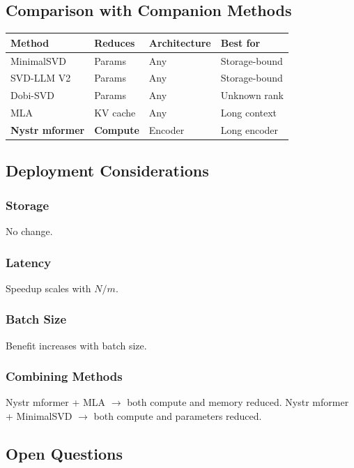\subsection{Comparison with Companion Methods}

\begin{table}[H]
\centering
\small
\begin{tabular}{llll}
\toprule
\textbf{Method} & \textbf{Reduces} & \textbf{Architecture} & \textbf{Best for} \\
\midrule
MinimalSVD & Params & Any & Storage-bound \\
SVD-LLM V2 & Params & Any & Storage-bound \\
Dobi-SVD & Params & Any & Unknown rank \\
MLA & KV cache & Any & Long context \\
\textbf{Nystr mformer} & \textbf{Compute} & Encoder & Long encoder \\
\bottomrule
\end{tabular}
\end{table}

\subsection{Deployment Considerations}

\subsubsection{Storage}
No change.

\subsubsection{Latency}
Speedup scales with $N / m$.

\subsubsection{Batch Size}
Benefit increases with batch size.

\subsubsection{Combining Methods}
Nystr mformer + MLA $\to$ both compute and memory reduced.
Nystr mformer + MinimalSVD $\to$ both compute and parameters reduced.

\subsection{Open Questions}

